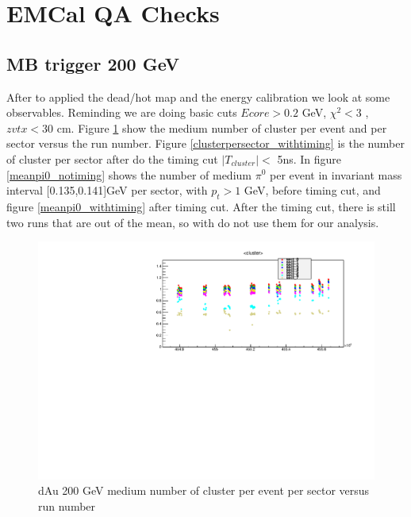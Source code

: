 \documentclass{article}
\begin{document}
\section{EMCal QA Checks}
\subsection{MB trigger 200 GeV}
After to applied the dead/hot map and the energy calibration we look at some observables. Reminding we are doing basic cuts  $Ecore > 0.2 $ GeV, $\chi^2 < 3$ ,$zvtx<30$ cm.
 Figure \ref{clustervsrun200GeV_notiming} show the medium number of cluster per event and per sector versus the run number. Figure \ref{clusterpersector_withtiming} is the number of cluster per sector after do the timing cut $\vert T_{cluster} \vert <$ 5ns.
 \newline
 In figure \ref{meanpi0_notiming} shows the number of medium $\pi^{0}$ per event in invariant mass interval [0.135,0.141]GeV per sector, with $p_{t} > 1$ GeV, before timing cut, and figure \ref{meanpi0_withtiming} after timing cut.
 After the timing cut, there is still two runs that are out of the mean, so with do not use them for our analysis.
\begin{figure}
    \centering
    \includegraphics[width=1\textwidth]{fig_pi0vn/meancluster_notiming.pdf}
    \caption{dAu 200 GeV  medium number of cluster per event per sector versus run number}
    \label{clustervsrun200GeV_notiming}
\end{figure}
\end{document}
